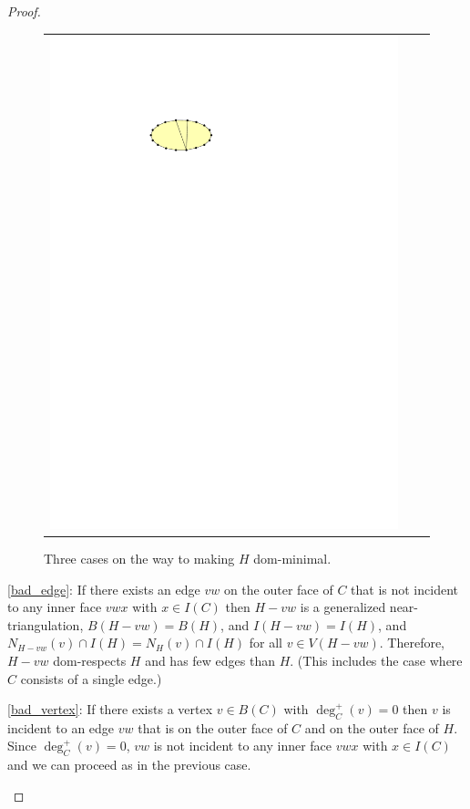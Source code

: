 \documentclass[12pt]{article}
\theoremstyle{definition}
\begin{document}
\begin{proof}
\begin{figure}
\begin{tabular}{ccc}
      \includegraphics[page=6]{figs/minimal}
    \end{tabular}
    \caption{Three cases on the way to making $H$ dom-minimal.}
    \label{minimal_fig}
  \end{figure}
  \begin{compactenum}
    \item \cref{bad_edge}: If there exists an edge $vw$ on the outer face of $C$ that is not incident to any inner face $vwx$ with $x\in I(C)$ then $H-vw$ is a generalized near-triangulation, $B(H-vw)=B(H)$, and $I(H-vw)=I(H)$, and $N_{H-vw}(v)\cap I(H)=N_{H}(v)\cap I(H)$ for all $v\in V(H-vw)$. Therefore, $H-vw$ dom-respects $H$ and has few edges than $H$. (This includes the case where $C$ consists of a single edge.)

    \item \cref{bad_vertex}: If there exists a vertex $v\in B(C)$ with $\deg^+_C(v)=0$ then $v$ is incident to an edge $vw$ that is on the outer face of $C$ and on the outer face of $H$. Since $\deg^+_C(v)=0$, $vw$ is not incident to any inner face $vwx$ with $x\in I(C)$ and we can proceed as in the previous case.


\end{compactenum}
\end{proof}
\end{document}
